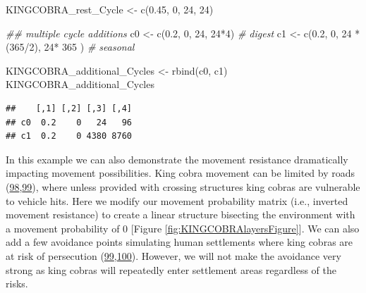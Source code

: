 \documentclass[10pt,a4paper]{article}
\newenvironment{Shaded}{}{}
\newcommand{\CommentTok}[1]{\textit{#1}}
\newcommand{\DecValTok}[1]{#1}
\newcommand{\DocumentationTok}[1]{\textit{#1}}
\newcommand{\FloatTok}[1]{#1}
\newcommand{\FunctionTok}[1]{#1}
\newcommand{\NormalTok}[1]{#1}
\newcommand{\OtherTok}[1]{#1}
\newcommand{\SpecialCharTok}[1]{#1}
\begin{document}
\begin{Shaded}
\begin{Highlighting}[]
\NormalTok{KINGCOBRA\_rest\_Cycle }\OtherTok{\textless{}{-}} \FunctionTok{c}\NormalTok{(}\FloatTok{0.45}\NormalTok{, }\DecValTok{0}\NormalTok{, }\DecValTok{24}\NormalTok{, }\DecValTok{24}\NormalTok{)}

\DocumentationTok{\#\# multiple cycle additions}
\NormalTok{c0 }\OtherTok{\textless{}{-}} \FunctionTok{c}\NormalTok{(}\FloatTok{0.2}\NormalTok{, }\DecValTok{0}\NormalTok{, }\DecValTok{24}\NormalTok{, }\DecValTok{24}\SpecialCharTok{*}\DecValTok{4}\NormalTok{) }\CommentTok{\# digest}
\NormalTok{c1 }\OtherTok{\textless{}{-}} \FunctionTok{c}\NormalTok{(}\FloatTok{0.2}\NormalTok{, }\DecValTok{0}\NormalTok{, }\DecValTok{24} \SpecialCharTok{*}\NormalTok{ (}\DecValTok{365}\SpecialCharTok{/}\DecValTok{2}\NormalTok{), }\DecValTok{24}\SpecialCharTok{*} \DecValTok{365}\NormalTok{ ) }\CommentTok{\# seasonal}

\NormalTok{KINGCOBRA\_additional\_Cycles }\OtherTok{\textless{}{-}} \FunctionTok{rbind}\NormalTok{(c0, c1)}
\NormalTok{KINGCOBRA\_additional\_Cycles}
\end{Highlighting}
\end{Shaded}

\begin{verbatim}
##    [,1] [,2] [,3] [,4]
## c0  0.2    0   24   96
## c1  0.2    0 4380 8760
\end{verbatim}

In this example we can also demonstrate the movement resistance dramatically impacting movement possibilities.
King cobra movement can be limited by roads (\protect\hyperlink{ref-jones_how_2022}{98},\protect\hyperlink{ref-Marshall2018b}{99}), where unless provided with crossing structures king cobras are vulnerable to vehicle hits.
Here we modify our movement probability matrix (i.e., inverted movement resistance) to create a linear structure bisecting the environment with a movement probability of 0 {[}Figure \ref{fig:KINGCOBRAlayersFigure}{]}.
We can also add a few avoidance points simulating human settlements where king cobras are at risk of persecution (\protect\hyperlink{ref-Marshall2018b}{99},\protect\hyperlink{ref-Shankar2013}{100}).
However, we will not make the avoidance very strong as king cobras will repeatedly enter settlement areas regardless of the risks.
\end{document}
